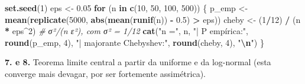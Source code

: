 \documentclass[
  portuguese,
  11pt,
  openany]{book}
\newenvironment{Shaded}{\begin{snugshade}}{\end{snugshade}}
\newcommand{\CommentTok}[1]{\textcolor[rgb]{0.56,0.35,0.01}{\textit{#1}}}
\newcommand{\ControlFlowTok}[1]{\textcolor[rgb]{0.13,0.29,0.53}{\textbf{#1}}}
\newcommand{\DecValTok}[1]{\textcolor[rgb]{0.00,0.00,0.81}{#1}}
\newcommand{\FloatTok}[1]{\textcolor[rgb]{0.00,0.00,0.81}{#1}}
\newcommand{\FunctionTok}[1]{\textcolor[rgb]{0.13,0.29,0.53}{\textbf{#1}}}
\newcommand{\NormalTok}[1]{#1}
\newcommand{\OtherTok}[1]{\textcolor[rgb]{0.56,0.35,0.01}{#1}}
\newcommand{\SpecialCharTok}[1]{\textcolor[rgb]{0.81,0.36,0.00}{\textbf{#1}}}
\newcommand{\StringTok}[1]{\textcolor[rgb]{0.31,0.60,0.02}{#1}}
\begin{document}
\begin{Shaded}
\begin{Highlighting}[]
\FunctionTok{set.seed}\NormalTok{(}\DecValTok{1}\NormalTok{)}
\NormalTok{eps }\OtherTok{\textless{}{-}} \FloatTok{0.05}
\ControlFlowTok{for}\NormalTok{ (n }\ControlFlowTok{in} \FunctionTok{c}\NormalTok{(}\DecValTok{10}\NormalTok{, }\DecValTok{50}\NormalTok{, }\DecValTok{100}\NormalTok{, }\DecValTok{500}\NormalTok{)) \{}
\NormalTok{  p\_emp }\OtherTok{\textless{}{-}} \FunctionTok{mean}\NormalTok{(}\FunctionTok{replicate}\NormalTok{(}\DecValTok{5000}\NormalTok{, }\FunctionTok{abs}\NormalTok{(}\FunctionTok{mean}\NormalTok{(}\FunctionTok{runif}\NormalTok{(n)) }\SpecialCharTok{{-}} \FloatTok{0.5}\NormalTok{) }\SpecialCharTok{\textgreater{}}\NormalTok{ eps))}
\NormalTok{  cheby }\OtherTok{\textless{}{-}}\NormalTok{ (}\DecValTok{1}\SpecialCharTok{/}\DecValTok{12}\NormalTok{) }\SpecialCharTok{/}\NormalTok{ (n }\SpecialCharTok{*}\NormalTok{ eps}\SpecialCharTok{\^{}}\DecValTok{2}\NormalTok{)   }\CommentTok{\# σ²/(n ε²), com σ² = 1/12}
  \FunctionTok{cat}\NormalTok{(}\StringTok{"n ="}\NormalTok{, n, }\StringTok{"| P empírica:"}\NormalTok{, }\FunctionTok{round}\NormalTok{(p\_emp, }\DecValTok{4}\NormalTok{),}
      \StringTok{"| majorante Chebyshev:"}\NormalTok{, }\FunctionTok{round}\NormalTok{(cheby, }\DecValTok{4}\NormalTok{), }\StringTok{"}\SpecialCharTok{\textbackslash{}n}\StringTok{"}\NormalTok{)}
\NormalTok{\}}
\end{Highlighting}
\end{Shaded}

\textbf{7. e 8.} Teorema limite central a partir da uniforme e da log-normal (esta
converge mais devagar, por ser fortemente assimétrica).
\end{document}

